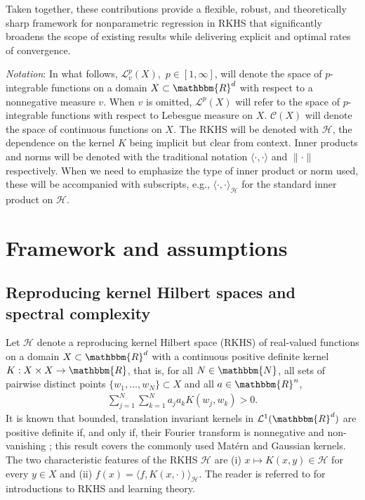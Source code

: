\documentclass[11pt]{article}
\theoremstyle{definition}
\theoremstyle{remark}
\begin{document}
Taken together, these contributions provide a flexible, robust, and theoretically sharp framework for nonparametric regression in RKHS that significantly broadens the scope of existing results while delivering explicit and optimal rates of convergence.

\vspace{0.3cm}
\textit{Notation}: In what follows, $\mathcal{L}_v^p(X)$,\ $p \in [1,\infty]$, will denote the space of $p$-integrable functions on a domain $X \subset \mathbbm{R}^d$ with respect to a nonnegative measure $v$. When $v$ is omitted, $\mathcal{L}^p(X)$ will refer to the space of $p$-integrable functions with respect to Lebesgue measure on $X$. $\mathcal{C}(X)$ will denote the space of continuous functions on $X$. The RKHS will be denoted with $\mathcal{H}$, the dependence on the kernel $K$ being implicit but clear from context.  Inner products and norms will be denoted with the traditional notation $\langle \cdot, \cdot \rangle$ and $\|\cdot\|$ respectively. When we need to emphasize the type of inner product or norm used, these will be accompanied with subscripts, e.g., $\langle \cdot, \cdot \rangle_{\mathcal{H}}$ for the standard inner product on $\mathcal{H}$.

\section{Framework and assumptions}

\subsection{Reproducing kernel Hilbert spaces and spectral complexity}
\label{sec:kernel}

Let $\mathcal{H}$ denote a reproducing kernel Hilbert space (RKHS) of real-valued functions on a domain $X \subset \mathbbm{R}^d$ with a continuous positive definite kernel $K: X \times X \to \mathbbm{R}$, that is, for all $N \in \mathbbm{N}$, all sets of pairwise distinct points $\{w_1, \ldots, w_N\} \subset X$ and all $a \in \mathbbm{R}^n$, 
\begin{align*}
\sum_{j=1}^N \sum_{k=1}^N a_j a_k K(w_j,w_k)>0.
\end{align*}
It is known that bounded, translation invariant kernels in $\mathcal{L}^1(\mathbbm{R}^d)$ are positive definite if, and only if, their Fourier transform is nonnegative and non-vanishing \citep[Theorem 6.11]{Wend:2005}; this result covers the commonly used Mat\'ern and Gaussian kernels. The two characteristic features of the RKHS $\mathcal{H}$ are (i) $x \mapsto K(x,y) \in \mathcal{H}$ for every $y \in X$ and (ii) $f(x) = \langle f, K(x,\cdot)\rangle_{\mathcal{H}}$. The reader is referred to \citep{S:2002, Ber:2004, Wend:2005, St:2008} for introductions to RKHS and learning theory.
\end{document}

